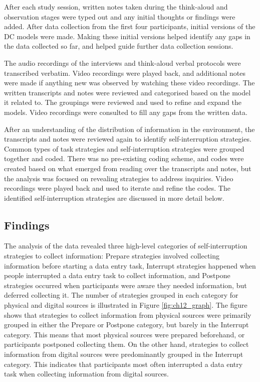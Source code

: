 After each study session, written notes taken during the think-aloud and observation stages were typed out and any initial thoughts or findings were added. After data collection from the first four participants, initial versions of the DC models were made. Making these initial versions helped identify any gaps in the data collected so far, and helped guide further data collection sessions. 

The audio recordings of the interviews and think-aloud verbal protocols were transcribed verbatim. Video recordings were played back, and additional notes were made if anything new was observed by watching these video recordings. The written transcripts and notes were reviewed and categorised based on the model it related to. The groupings were reviewed and used to refine and expand the models. Video recordings were consulted to fill any gaps from the written data.


After an understanding of the distribution of information in the environment, the transcripts and notes were reviewed again to identify self-interruption strategies. Common types of task strategies and self-interruption strategies were grouped together and coded. There was no pre-existing coding scheme, and codes were created based on what emerged from reading over the transcripts and notes, but the analysis was focused on revealing strategies to address inquiries. Video recordings were played back and used to iterate and refine the codes. The identified self-interruption strategies are discussed in more detail below. 

\subsection{Findings}
The analysis of the data revealed three high-level categories of self-interruption strategies to collect information: Prepare strategies involved collecting information before starting a data entry task, Interrupt strategies happened when people interrupted a data entry task to collect information, and Postpone strategies occurred when participants were aware they needed information, but deferred collecting it. The number of strategies grouped in each category for physical and digital sources is illustrated in Figure \ref{fig:ch12_graph}. The figure shows that strategies to collect information from physical sources were primarily grouped in either the Prepare or Postpone category, but barely in the Interrupt category. This means that most physical sources were prepared beforehand, or participants postponed collecting them. On the other hand, strategies to collect information from digital sources were predominantly grouped in the Interrupt category. This indicates that participants most often interrupted a data entry task when collecting information from digital sources. 


